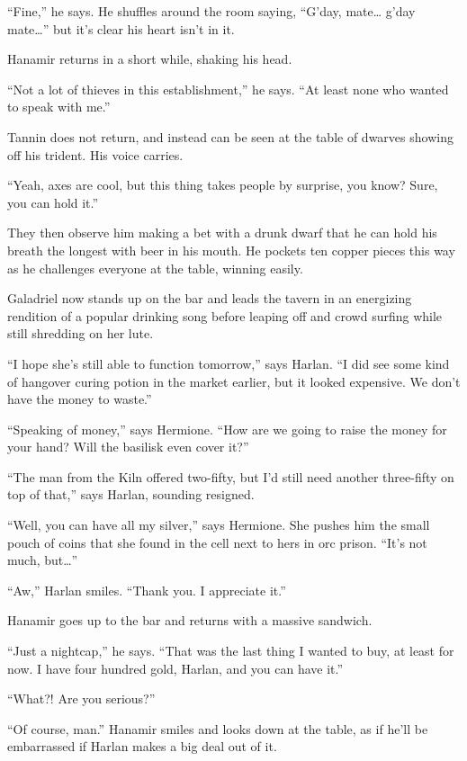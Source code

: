 \documentclass[smalldemyvopaper,11pt,twoside,onecolumn,openright,extrafontsizes]{memoir}
\begin{document}
``Fine,'' he says. He shuffles around the room saying, ``G'day,
mate\ldots{} g'day mate\ldots{}'' but it's clear his heart isn't in it.

Hanamir returns in a short while, shaking his head.

``Not a lot of thieves in this establishment,'' he says. ``At least none
who wanted to speak with me.''

Tannin does not return, and instead can be seen at the table of dwarves
showing off his trident. His voice carries.

``Yeah, axes are cool, but this thing takes people by surprise, you
know? Sure, you can hold it.''

They then observe him making a bet with a drunk dwarf that he can hold
his breath the longest with beer in his mouth. He pockets ten copper
pieces this way as he challenges everyone at the table, winning easily.

Galadriel now stands up on the bar and leads the tavern in an energizing
rendition of a popular drinking song before leaping off and crowd
surfing while still shredding on her lute.

``I hope she's still able to function tomorrow,'' says Harlan. ``I did
see some kind of hangover curing potion in the market earlier, but it
looked expensive. We don't have the money to waste.''

``Speaking of money,'' says Hermione. ``How are we going to raise the
money for your hand? Will the basilisk even cover it?''

``The man from the Kiln offered two-fifty, but I'd still need another
three-fifty on top of that,'' says Harlan, sounding resigned.

``Well, you can have all my silver,'' says Hermione. She pushes him the
small pouch of coins that she found in the cell next to hers in orc
prison. ``It's not much, but\ldots{}''

``Aw,'' Harlan smiles. ``Thank you. I appreciate it.''

Hanamir goes up to the bar and returns with a massive sandwich.

``Just a nightcap,'' he says. ``That was the last thing I wanted to buy,
at least for now. I have four hundred gold, Harlan, and you can have
it.''

``What?! Are you serious?''

``Of course, man.'' Hanamir smiles and looks down at the table, as if
he'll be embarrassed if Harlan makes a big deal out of it.
\end{document}
